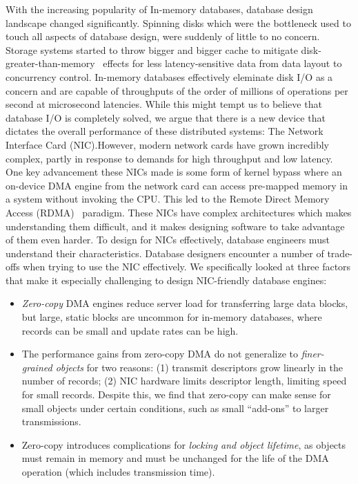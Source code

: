 With the increasing popularity of In-memory databases, database design landscape changed significantly.
Spinning disks which were the bottleneck used to touch all aspects of database design, were suddenly 
of little to no concern. Storage systems started to throw bigger and bigger cache to mitigate 
disk-greater-than-memory~\cite{couchbase} effects for less latency-sensitive data
from data layout to concurrency control. In-memory databases effectively eleminate disk I/O
as a concern and are capable of throughputs of the order of millions of operations per second
at microsecond latencies. While this might tempt us to believe that database I/O is completely
solved, we argue that there is a new device that dictates the overall performance of these 
distributed systems: The Network Interface Card (NIC).However, modern
network cards have grown incredibly complex, partly in response to
demands for high throughput and low latency.  One key advancement these NICs made 
is some form of kernel bypass where an on-device DMA engine from the network card 
can access pre-mapped memory in a system without invoking the CPU. This led to the Remote 
Direct Memory Access (RDMA)~\cite{rdmapatent} paradigm. These NICs have complex architectures
which makes understanding them difficult, and it makes designing software to take advantage
of them even harder. To design for NICs effectively, database
engineers must understand their characteristics. Database designers encounter
a number of trade-offs when trying to use the NIC effectively. We specifically 
looked at three factors that make it especially challenging to design NIC-friendly
database engines:
\begin{itemize}
  \item {\em Zero-copy} DMA engines reduce server load for transferring large data
    blocks, but large, static blocks are uncommon for in-memory databases,
    where records can be small and update rates can be high.
  \item The performance gains from zero-copy DMA do not generalize to
      {\em finer-grained objects} for two reasons: (1) transmit
      descriptors grow linearly in the number of records;
      (2) NIC hardware limits descriptor
      length, limiting speed for small records.
      Despite this, we find that zero-copy
      can make sense for small objects under certain conditions, such as
      small ``add-ons'' to larger transmissions.
   \item Zero-copy introduces complications for \emph{locking and object
      lifetime}, as objects must remain in memory and must be
      unchanged for the life of the DMA operation (which includes transmission
      time).
\end{itemize}


